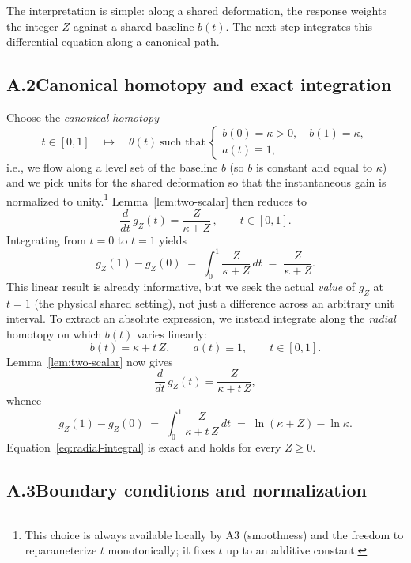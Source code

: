 \documentclass[11pt]{article}
\begin{document}
\medskip

\noindent The interpretation is simple: along a shared deformation, the response weights the integer $Z$ against a shared baseline $b(t)$. The next step integrates this differential equation along a canonical path.

\subsection*{A.2\quad Canonical homotopy and exact integration}

Choose the \emph{canonical homotopy}
\[
t\in[0,1]\quad\longmapsto\quad \theta(t)\ \text{such that}\ 
\begin{cases}
b(0)=\kappa>0,\quad b(1)=\kappa,\\
a(t)\equiv 1,
\end{cases}
\]
i.e., we flow along a level set of the baseline $b$ (so $b$ is constant and equal to $\kappa$) and we pick units for the shared deformation so that the instantaneous gain is normalized to unity.\footnote{This choice is always available locally by A3 (smoothness) and the freedom to reparameterize $t$ monotonically; it fixes $t$ up to an additive constant.} Lemma~\ref{lem:two-scalar} then reduces to
\[
\frac{d}{dt}\,g_Z(t)=\frac{Z}{\kappa+Z}\,,
\qquad t\in[0,1].
\]
Integrating from $t=0$ to $t=1$ yields
\begin{equation}\label{eq:log-difference}
g_Z(1)-g_Z(0)\;=\;\int_0^1 \frac{Z}{\kappa+Z}\,dt\;=\;\frac{Z}{\kappa+Z}.
\end{equation}
This linear result is already informative, but we seek the actual \emph{value} of $g_Z$ at $t=1$ (the physical shared setting), not just a difference across an arbitrary unit interval. To extract an absolute expression, we instead integrate along the \emph{radial} homotopy on which $b(t)$ varies linearly:
\[
b(t)=\kappa+t\,Z,\qquad a(t)\equiv 1,\qquad t\in[0,1].
\]
Lemma~\ref{lem:two-scalar} now gives
\[
\frac{d}{dt}\,g_Z(t)=\frac{Z}{\kappa+t\,Z},
\]
whence
\begin{equation}\label{eq:radial-integral}
g_Z(1)-g_Z(0)\;=\;\int_0^1 \frac{Z}{\kappa+t\,Z}\,dt\;=\;\ln(\kappa+Z)-\ln\kappa.
\end{equation}
Equation~\eqref{eq:radial-integral} is exact and holds for every $Z\ge 0$.

\subsection*{A.3\quad Boundary conditions and normalization}
\end{document}
